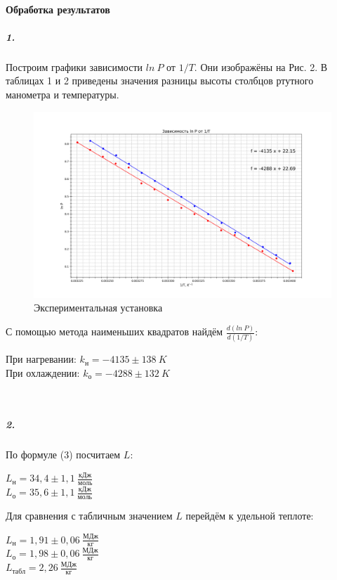\documentclass[a4paper,12pt]{article}
\begin{document}
\paragraph{Обработка результатов\\}
\subparagraph{1.} Построим графики зависимости $ln~P$ от $1/T$. Они изображёны на Рис. 2. В таблицах 1 и 2 приведены значения разницы высоты столбцов ртутного манометра и температуры. 
\begin{figure}[!h]
\centering
\includegraphics[width=0.9\linewidth]{graph.png}
\caption{Экспериментальная установка}
\label{fig:mpr}
\end{figure}
\newpage
С помощью метода наименьших квадратов найдём $\frac{d(ln~P)}{d(1/T)}$:
\begin{center}
    При нагревании: $k_{н} = -4135\pm 138~ K$\\
    При охлаждении: $k_{о} = -4288\pm 132~ K$
\end{center}\\
\subparagraph{2.} По формуле (3) посчитаем $L$:
\begin{center}
    $L_{н}=34,4\pm 1,1~\frac{кДж}{моль}$\\
    $L_{о}=35,6\pm 1,1~ \frac{кДж}{моль}$
\end{center}
Для сравнения с табличным значением $L$ перейдём к удельной теплоте:
\begin{center}
    $L_{н}=1,91\pm 0,06~\frac{МДж}{кг}$\\
    $L_{о}=1,98\pm 0,06~ \frac{МДж}{кг}$\\
    $L_{табл}=2,26~ \frac{МДж}{кг}$
\end{center}
\end{document}
